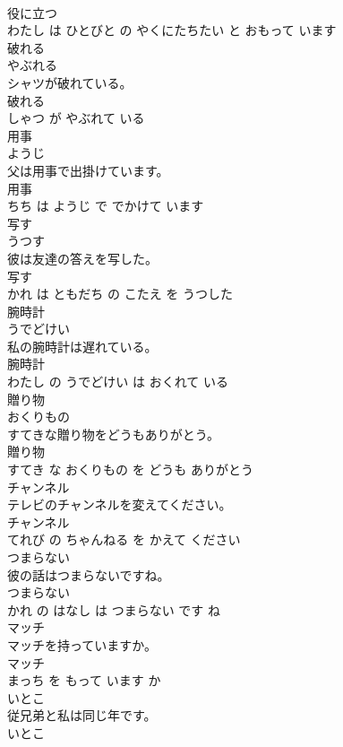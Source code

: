 \documentclass[8pt]{extreport}
\begin{document}
\begin{CJK}{UTF8}{min}
\\	役に立つ 
\\	わたし は ひとびと の やくにたちたい と おもって います			
\\	破れる	
\\	やぶれる			
\\	シャツが破れている。	
\\	破れる 
\\	しゃつ が やぶれて いる			
\\	用事	
\\	ようじ			
\\	父は用事で出掛けています。	
\\	用事 
\\	ちち は ようじ で でかけて います			
\\	写す	
\\	うつす			
\\	彼は友達の答えを写した。	
\\	写す 
\\	かれ は ともだち の こたえ を うつした			
\\	腕時計	
\\	うでどけい			
\\	私の腕時計は遅れている。	
\\	腕時計 
\\	わたし の うでどけい は おくれて いる			
\\	贈り物	
\\	おくりもの			
\\	すてきな贈り物をどうもありがとう。	
\\	贈り物 
\\	すてき な おくりもの を どうも ありがとう			
\\	チャンネル	
\\	テレビのチャンネルを変えてください。	
\\	チャンネル 
\\	てれび の ちゃんねる を かえて ください			
\\	つまらない	
\\	彼の話はつまらないですね。	
\\	つまらない 
\\	かれ の はなし は つまらない です ね			
\\	マッチ	
\\	マッチを持っていますか。	
\\	マッチ 
\\	まっち を もって います か			
\\	いとこ	
\\	従兄弟と私は同じ年です。	
\\	いとこ 

\end{CJK}
\end{document}
